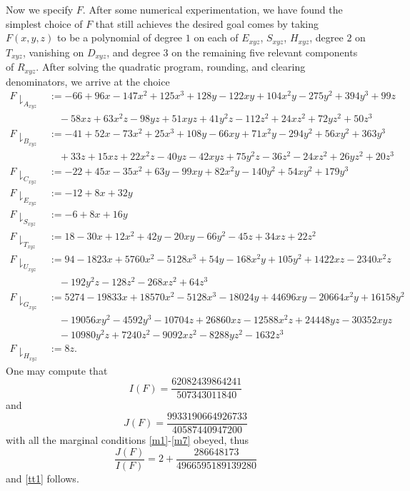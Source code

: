Now we specify $F$.  After some numerical experimentation, we have found the simplest choice of $F$ that still achieves the desired goal comes by taking $F(x,y,z)$ to be a polynomial of degree $1$ on each of $E_{xyz}$, $S_{xyz}$, $H_{xyz}$, degree $2$ on $T_{xyz}$, vanishing on $D_{xyz}$, and degree $3$ on the remaining five relevant components of $R_{xyz}$.  After solving the quadratic program, rounding, and clearing denominators, we arrive at the choice
\begin{align*}
F\downharpoonright_{A_{xyz}} &:= -66+96 x-147 x^2+125 x^3+128 y-122 x y+104 x^2 y-275 y^2+394 y^3+99 z\\
&\quad -58 x z+63 x^2 z-98 y z+51 x y z+41 y^2 z-112 z^2+24 x z^2+72 y z^2+50 z^3 \\
F\downharpoonright_{B_{xyz}} &:= -41+52 x-73 x^2+25 x^3+108 y-66 x y+71 x^2 y-294 y^2+56 x y^2+363 y^3\\
&\quad +33 z+15 x z+22 x^2 z-40 y z-42 x y z+75 y^2 z-36 z^2-24 x z^2+26 y z^2+20 z^3 \\
F\downharpoonright_{C_{xyz}} &:= -22+45 x-35 x^2+63 y-99 x y+82 x^2 y-140 y^2+54 x y^2+179 y^3 \\
F\downharpoonright_{E_{xyz}} &:= -12+8 x+32 y \\
F\downharpoonright_{S_{xyz}} &:= -6+8 x+16 y \\
F\downharpoonright_{T_{xyz}} &:= 18-30 x+12 x^2+42 y-20 x y-66 y^2-45 z+34 x z+22 z^2 \\
F\downharpoonright_{U_{xyz}} &:= 94-1823 x+5760 x^2-5128 x^3+54 y-168 x^2 y+105 y^2+1422 x z-2340 x^2 z\\
&\quad -192 y^2 z-128 z^2-268 x z^2+64 z^3 \\
F\downharpoonright_{G_{xyz}} &:= 5274-19833 x+18570 x^2-5128 x^3-18024 y+44696 x y-20664 x^2 y+16158 y^2\\
&\quad -19056 x y^2-4592 y^3-10704 z+26860 x z-12588 x^2 z+24448 y z-30352 x y z\\
&\quad -10980 y^2 z+7240 z^2-9092 x z^2-8288 y z^2-1632 z^3 \\
F\downharpoonright_{H_{xyz}} &:= 8 z.
\end{align*}
One may compute that
$$ I(F) = \frac{62082439864241}{507343011840}$$
and
$$ J(F) = \frac{9933190664926733}{40587440947200}$$
with all the marginal conditions \eqref{m1}-\eqref{m7} obeyed, thus
$$ \frac{J(F)}{I(F)} = 2 + \frac{286648173}{4966595189139280}$$
and \eqref{tt1} follows.

